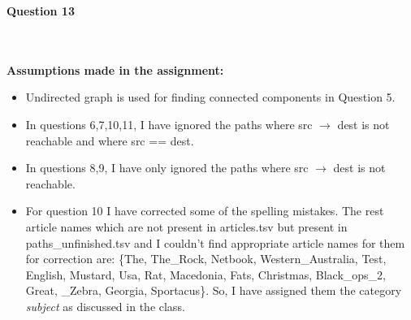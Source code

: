 \documentclass[20pt]{letter}
\begin{document}
\begin{enumerate}
{ \Large
\item \textbf{Question 13}
}
{ \fontsize{13}{18}\selectfont\\\\
\textbf{Assumptions made in the assignment:}
\begin{itemize}
    \item Undirected graph is used for finding connected components in Question 5.
    \item In questions 6,7,10,11, I have ignored the paths where src $\rightarrow$ dest is not reachable and where src == dest.
    \item In questions 8,9, I have only ignored the paths where src $\rightarrow$ dest is not reachable.
    \item For question 10 I have corrected some of the spelling mistakes. The rest article names which are not present in articles.tsv but present in paths\_unfinished.tsv and I couldn't find appropriate article names for them for correction are: \{The, The\_Rock, Netbook, Western\_Australia, Test, English, Mustard, Usa, Rat, Macedonia, Fats, Christmas, Black\_ops\_2, Great, \_Zebra, Georgia, Sportacus\}. So, I have assigned them the category \textit{subject} as discussed in the class.\\\\
\end{itemize}

}
\end{enumerate}
\end{document}
